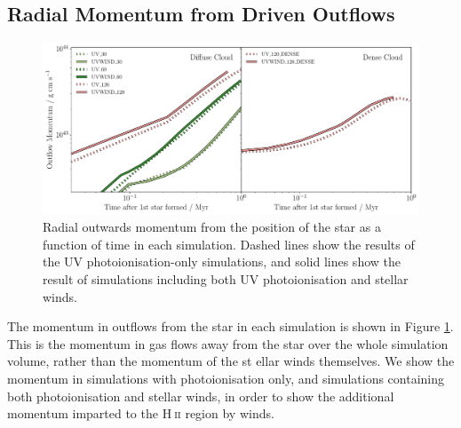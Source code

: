 \documentclass[a4paper,fleqn,usenatbib]{mnras}
\newcommand{\HII}{H$~$\textsc{ii}\xspace}
\begin{document}

\subsection{Radial Momentum from Driven Outflows}
\label{results:momentum}

\begin{figure}
	\includegraphics[width=1.9\columnwidth]{../plots/momentumatstarpos_both.pdf}
	\caption{Radial outwards momentum from the position of the star as a function of time in each simulation. Dashed lines show the results of the UV photoionisation-only simulations, and solid lines show the result of simulations including both UV photoionisation and stellar winds.}
	\label{fig:momentum}
\end{figure}

The momentum in outflows from the star in each simulation is shown in Figure \ref{fig:momentum}. This is the momentum in gas flows away from the star over the whole simulation volume, rather than the momentum of the st ellar winds themselves. We show the momentum in simulations with photoionisation only, and simulations containing both photoionisation and stellar winds, in order to show the additional momentum imparted to the \HII region by winds.
\end{document}
